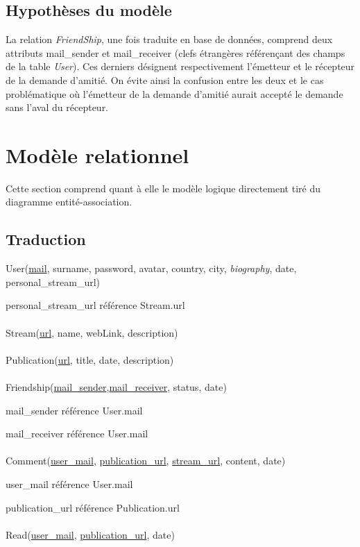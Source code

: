 \documentclass[a4paper,10pt]{article}
\begin{document}
\subsection{Hypothèses du modèle}

La relation \textsl{FriendShip}, une fois traduite en base de données, comprend deux attributs mail\_sender et mail\_receiver (clefs étrangères référençant des champs de la table \textsl{User}). Ces derniers désignent respectivement l'émetteur et le récepteur de la demande d'amitié. On évite ainsi la confusion entre les deux et le cas problématique où l'émetteur de la demande d'amitié aurait accepté le demande sans l'aval du récepteur.

\section{Modèle relationnel}

Cette section comprend quant à elle le modèle logique directement tiré du diagramme entité-association. 

\subsection{Traduction}

User(\underline {mail}, surname, password, avatar, country, city, \textsl{biography},  date, personal\_stream\_url)

personal\_stream\_url référence Stream.url
\\\\
Stream(\underline {url}, name, webLink, description)
\\\\
Publication(\underline {url}, title, date, description)
\\\\
Friendship(\underline {mail\_sender},\underline {mail\_receiver}, status, date)

mail\_sender référence User.mail 

mail\_receiver référence User.mail
\\\\
Comment(\underline {user\_mail}, \underline {publication\_url}, \underline {stream\_url}, content, date)

user\_mail référence User.mail

publication\_url référence Publication.url
\\\\
Read(\underline {user\_mail}, \underline {publication\_url}, date)
\end{document}
